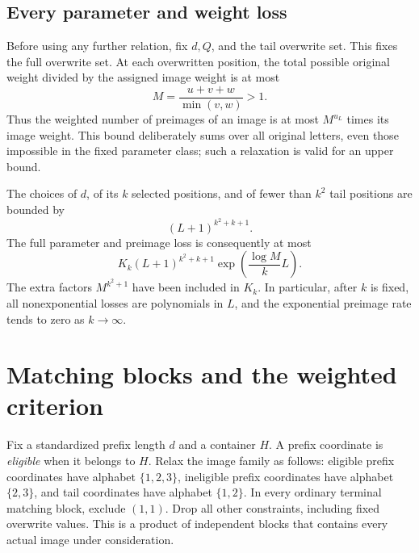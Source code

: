 \documentclass[11pt,letterpaper]{article}
\theoremstyle{definition}
\begin{document}
\subsection{Every parameter and weight loss}
Before using any further relation, fix $d,Q$, and the tail overwrite set. This fixes the full overwrite set. At each overwritten position, the total possible original weight divided by the assigned image weight is at most
\begin{equation}\label{ska:eq:M}
M=\frac{u+v+w}{\min(v,w)}>1.
\end{equation}
Thus the weighted number of preimages of an image is at most $M^{u_L}$ times its image weight. This bound deliberately sums over all original letters, even those impossible in the fixed parameter class; such a relaxation is valid for an upper bound.

The choices of $d$, of its $k$ selected positions, and of fewer than $k^2$ tail positions are bounded by
\begin{equation}\label{ska:eq:parameterloss}
(L+1)^{k^2+k+1}.
\end{equation}
The full parameter and preimage loss is consequently at most
\begin{equation}\label{ska:eq:preimageloss}
K_k(L+1)^{k^2+k+1}\exp\left(\frac{\log M}{k}L\right).
\end{equation}
The extra factors $M^{k^2+1}$ have been included in $K_k$. In particular, after $k$ is fixed, all nonexponential losses are polynomials in $L$, and the exponential preimage rate tends to zero as $k\to\infty$.

\section{Matching blocks and the weighted criterion}\label{ska:sec:criterion}
Fix a standardized prefix length $d$ and a container $H$. A prefix coordinate is \emph{eligible} when it belongs to $H$. Relax the image family as follows: eligible prefix coordinates have alphabet $\{1,2,3\}$, ineligible prefix coordinates have alphabet $\{2,3\}$, and tail coordinates have alphabet $\{1,2\}$. In every ordinary terminal matching block, exclude $(1,1)$. Drop all other constraints, including fixed overwrite values. This is a product of independent blocks that contains every actual image under consideration.
\end{document}
